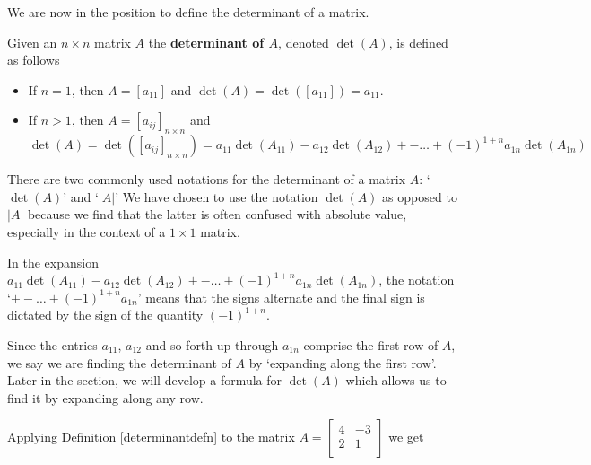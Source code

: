 \documentclass{ximera}
\begin{document}
We are now in the position to define the determinant of a matrix.

 


\begin{definition} \label{determinantdefn}   Given an $n \times n$ matrix $A$ the \textbf{determinant of \boldmath $A$}, denoted $\det(A)$, is defined as follows

\begin{itemize}

\item  If $n=1$, then $A = \left[ a_{11} \right]$ and $\det(A) = \det\left( \left[ a_{11} \right] \right) = a_{11}$.

\item  If $n>1$, then $A = \left[ a_{ij} \right]_{n \times n}$ and \[ \det(A) = \det\left( \left[ a_{ij} \right]_{n \times n} \right) =  a_{11} \det\left(A_{11}\right)- a_{12} \det\left(A_{12}\right) + -  \ldots  + (-1)^{1+n} a_{1n} \det\left(A_{1n}\right)\]

\end{itemize}

\end{definition}

 

There are two commonly used notations for the determinant of a matrix $A$: `$\det(A)$' and `$|A|$'
We have chosen to use the notation $\det(A)$ as opposed to $|A|$ because we find that the latter is often confused with absolute value, especially in the context of a $1 \times 1$ matrix.  

In the expansion $a_{11} \det\left(A_{11}\right)- a_{12} \det\left(A_{12}\right) + -  \ldots  + (-1)^{1+n} a_{1n} \det\left(A_{1n}\right)$, the notation `$+ -  \ldots  + (-1)^{1+n} a_{1n}$' means that the signs alternate and the final sign is dictated by the sign of the quantity $(-1)^{1+n}$. 

Since the entries $a_{11}$, $a_{12}$ and so forth up through $a_{1n}$ comprise the first row of $A$, we say we are finding the determinant of $A$  by `expanding along the first row'. Later in the section, we will develop a formula for $\det(A)$ which allows us to find it by expanding along any row.

 

Applying Definition \ref{determinantdefn} to the matrix $A = \left[ \begin{array}{rr} 4 & -3 \\ 2 & 1 \\ \end{array} \right]$ we get
\end{document}
